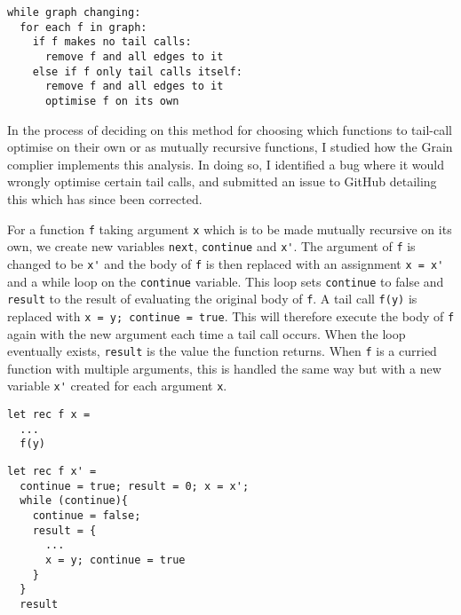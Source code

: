 \begin{verbatim}
while graph changing:
  for each f in graph:
    if f makes no tail calls:
      remove f and all edges to it
    else if f only tail calls itself:
      remove f and all edges to it
      optimise f on its own
\end{verbatim}

In the process of deciding on this method for choosing which functions to tail-call optimise on their own or as mutually recursive functions, I studied how the Grain complier implements this analysis. In doing so, I identified a bug where it would wrongly optimise certain tail calls, and submitted an issue to GitHub detailing this which has since been corrected. %

For a function \verb|f| taking argument \verb|x| which is to be made mutually recursive on its own, we create new variables \verb|next|, \verb|continue| and \verb|x'|. The argument of \verb|f| is changed to be \verb|x'| and the body of \verb|f| is then replaced with an assignment \verb|x = x'| and a while loop on the \verb|continue| variable. This loop sets \verb|continue| to false and \verb|result| to the result of evaluating the original body of \verb|f|. A tail call \verb|f(y)| is replaced with \verb|x = y; continue = true|. This will therefore execute the body of \verb|f| again with the new argument each time a tail call occurs. When the loop eventually exists, \verb|result| is the value the function returns. When \verb|f| is a curried function with multiple arguments, this is handled the same way but with a new variable \verb|x'| created for each argument \verb|x|.

\begin{minipage}{0.3\textwidth}
\begin{verbatim}
let rec f x = 
  ...
  f(y)
\end{verbatim}
\end{minipage}
\hfill
\begin{minipage}{0.6\textwidth}
\begin{verbatim}
let rec f x' = 
  continue = true; result = 0; x = x';
  while (continue){
    continue = false;
    result = {
      ...
      x = y; continue = true
    }
  }
  result
\end{verbatim}
\end{minipage}

